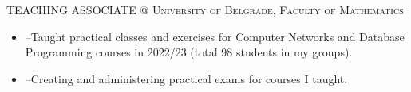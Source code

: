 \begin{minipage}[t]{\linewidth}\vspace{\subsectionSpace}%
{\subtitleFont\bold TEACHING ASSOCIATE \extraLight\scshape @ University of Belgrade, Faculty of Mathematics}\newline
\vfill\vspace{\dateTopMargin}{\dateFont\extraLight Oct 2022--Oct 2023\alignRight}\linebreak\newline

{\vspace{\contentTopMargin}\contentFont \begin{itemize}
\item --Taught practical classes and exercises for Computer Networks and Database Programming courses in 2022/23 (total 98 students in my groups).
\item --Creating and administering practical exams for courses I taught.
\end{itemize}}%
\end{minipage}%
